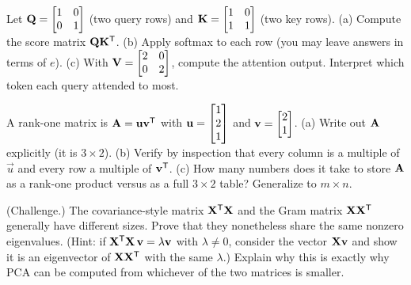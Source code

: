 \begin{exercise}
Let $\mathbf{Q}=\begin{bmatrix}1&0\\0&1\end{bmatrix}$ (two query rows) and
$\mathbf{K}=\begin{bmatrix}1&0\\1&1\end{bmatrix}$ (two key rows).
(a) Compute the score matrix $\mathbf{Q}\mathbf{K}^{\mathsf{T}}$.
(b) Apply softmax to each row (you may leave answers in terms of $e$).
(c) With $\mathbf{V}=\begin{bmatrix}2&0\\0&2\end{bmatrix}$, compute the attention output.
Interpret which token each query attended to most.
\end{exercise}

\begin{exercise}
A rank-one matrix is $\mathbf{A}=\mathbf{u}\mathbf{v}^{\mathsf{T}}$ with $\mathbf{u}=\begin{bmatrix}1\\2\\1\end{bmatrix}$ and
$\mathbf{v}=\begin{bmatrix}2\\1\end{bmatrix}$.
(a) Write out $\mathbf{A}$ explicitly (it is $3\times2$).
(b) Verify by inspection that every column is a multiple of $\vec{u}$ and every row a
multiple of $\mathbf{v}^{\mathsf{T}}$.
(c) How many numbers does it take to store $\mathbf{A}$ as a rank-one product versus as a
full $3\times2$ table? Generalize to $m\times n$.
\end{exercise}

\begin{exercise}
(Challenge.) The covariance-style matrix $\mathbf{X}^{\mathsf{T}}\mathbf{X}$ and the Gram matrix
$\mathbf{X}\mathbf{X}^{\mathsf{T}}$ generally have different sizes. Prove that they nonetheless share the
same nonzero eigenvalues. (Hint: if $\mathbf{X}^{\mathsf{T}}\mathbf{X}\,\mathbf{v}=\lambda\mathbf{v}$ with
$\lambda\neq0$, consider the vector $\mathbf{X}\mathbf{v}$ and show it is an eigenvector of
$\mathbf{X}\mathbf{X}^{\mathsf{T}}$ with the same $\lambda$.) Explain why this is exactly why PCA can be
computed from whichever of the two matrices is smaller.
\end{exercise}
